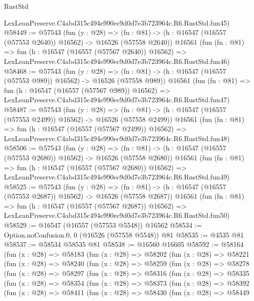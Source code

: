 \begin{lexlean}{RustStd}
\begin{coremodule}
    LexLeanPreserve.C4abd315c494e990ec9d0d7e3b723964c.R6.RustStd.fun45)
@58449 := @57543
    (fun (y : @28) =>
    (fn : @81) -> (h : @16547 (@16557 (@57553 @2640)) @16562) -> @16526 (@57558 @2640))
    @16561
    (fun (fn : @81) =>
    fun (h : @16547 (@16557 (@57567 @2640)) @16562) =>
    LexLeanPreserve.C4abd315c494e990ec9d0d7e3b723964c.R6.RustStd.fun46)
@58468 := @57543
    (fun (y : @28) =>
    (fn : @81) -> (h : @16547 (@16557 (@57553 @989)) @16562) -> @16526 (@57558 @989))
    @16561
    (fun (fn : @81) =>
    fun (h : @16547 (@16557 (@57567 @989)) @16562) =>
    LexLeanPreserve.C4abd315c494e990ec9d0d7e3b723964c.R6.RustStd.fun47)
@58487 := @57543
    (fun (y : @28) =>
    (fn : @81) -> (h : @16547 (@16557 (@57553 @2499)) @16562) -> @16526 (@57558 @2499))
    @16561
    (fun (fn : @81) =>
    fun (h : @16547 (@16557 (@57567 @2499)) @16562) =>
    LexLeanPreserve.C4abd315c494e990ec9d0d7e3b723964c.R6.RustStd.fun48)
@58506 := @57543
    (fun (y : @28) =>
    (fn : @81) -> (h : @16547 (@16557 (@57553 @2680)) @16562) -> @16526 (@57558 @2680))
    @16561
    (fun (fn : @81) =>
    fun (h : @16547 (@16557 (@57567 @2680)) @16562) =>
    LexLeanPreserve.C4abd315c494e990ec9d0d7e3b723964c.R6.RustStd.fun49)
@58525 := @57543
    (fun (y : @28) =>
    (fn : @81) -> (h : @16547 (@16557 (@57553 @2687)) @16562) -> @16526 (@57558 @2687))
    @16561
    (fun (fn : @81) =>
    fun (h : @16547 (@16557 (@57567 @2687)) @16562) =>
    LexLeanPreserve.C4abd315c494e990ec9d0d7e3b723964c.R6.RustStd.fun50)
@58529 := @16547 (@16557 (@57553 @5548)) @16562
@58534 := Option.noConfusion.{0, 0} (@16526 (@57558 @5548)) @81
@58535 := @4535 @81
@58537 := @58534 @58535 @81
@58538 := @16560 @16605
@58592 := @58164
    (fun (x : @28) =>
    @58183
      (fun (x : @28) =>
      @58202
        (fun (x : @28) =>
        @58221
          (fun (x : @28) =>
          @58240
            (fun (x : @28) =>
            @58259
              (fun (x : @28) =>
              @58278
                (fun (x : @28) =>
                @58297
                  (fun (x : @28) =>
                  @58316
                    (fun (x : @28) =>
                    @58335
                      (fun (x : @28) =>
                      @58354
                        (fun (x : @28) =>
                        @58373
                          (fun (x : @28) =>
                          @58392
                            (fun (x : @28) =>
                            @58411
                              (fun (x : @28) =>
                              @58430
                                (fun (x : @28) =>
                                @58449

\end{coremodule}
\end{lexlean}
